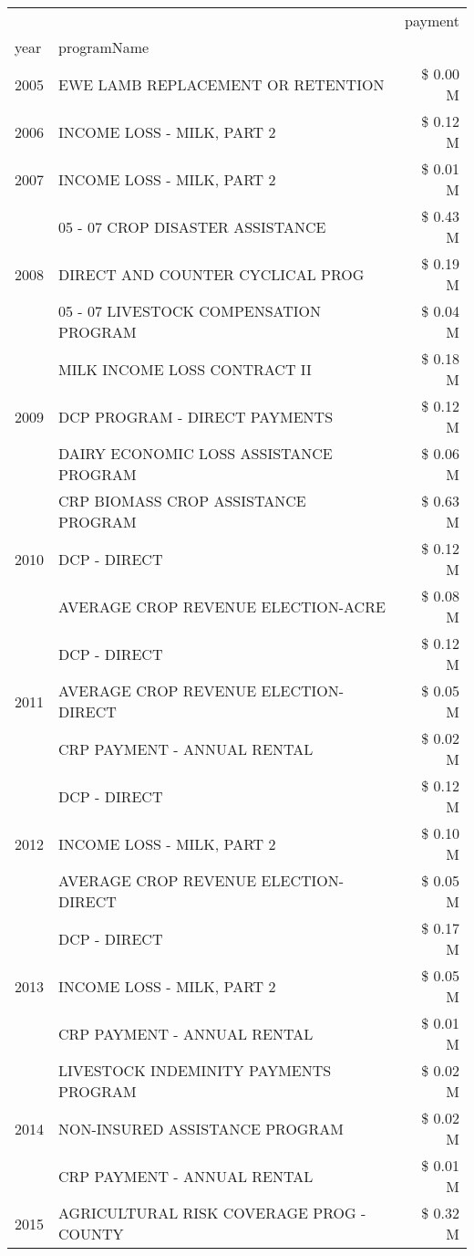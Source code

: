 \begin{tabular}{llr}
\toprule
 &  & payment \\
year & programName &  \\
\midrule
2005 & EWE LAMB REPLACEMENT OR RETENTION & \$ 0.00 M \\
\cline{1-3}
2006 & INCOME LOSS - MILK, PART 2 & \$ 0.12 M \\
\cline{1-3}
2007 & INCOME LOSS - MILK, PART 2 & \$ 0.01 M \\
\cline{1-3}
\multirow[t]{3}{*}{2008} & 05 - 07 CROP DISASTER ASSISTANCE & \$ 0.43 M \\
 & DIRECT AND COUNTER CYCLICAL PROG & \$ 0.19 M \\
 & 05 - 07 LIVESTOCK COMPENSATION PROGRAM & \$ 0.04 M \\
\cline{1-3}
\multirow[t]{3}{*}{2009} & MILK INCOME LOSS CONTRACT II & \$ 0.18 M \\
 & DCP PROGRAM - DIRECT PAYMENTS & \$ 0.12 M \\
 & DAIRY ECONOMIC LOSS ASSISTANCE PROGRAM & \$ 0.06 M \\
\cline{1-3}
\multirow[t]{3}{*}{2010} & CRP BIOMASS CROP ASSISTANCE PROGRAM & \$ 0.63 M \\
 & DCP - DIRECT & \$ 0.12 M \\
 & AVERAGE CROP REVENUE ELECTION-ACRE & \$ 0.08 M \\
\cline{1-3}
\multirow[t]{3}{*}{2011} & DCP - DIRECT & \$ 0.12 M \\
 & AVERAGE CROP REVENUE ELECTION-DIRECT & \$ 0.05 M \\
 & CRP PAYMENT - ANNUAL RENTAL & \$ 0.02 M \\
\cline{1-3}
\multirow[t]{3}{*}{2012} & DCP - DIRECT & \$ 0.12 M \\
 & INCOME LOSS - MILK, PART 2 & \$ 0.10 M \\
 & AVERAGE CROP REVENUE ELECTION-DIRECT & \$ 0.05 M \\
\cline{1-3}
\multirow[t]{3}{*}{2013} & DCP - DIRECT & \$ 0.17 M \\
 & INCOME LOSS - MILK, PART 2 & \$ 0.05 M \\
 & CRP PAYMENT - ANNUAL RENTAL & \$ 0.01 M \\
\cline{1-3}
\multirow[t]{3}{*}{2014} & LIVESTOCK INDEMINITY PAYMENTS PROGRAM & \$ 0.02 M \\
 & NON-INSURED ASSISTANCE PROGRAM & \$ 0.02 M \\
 & CRP PAYMENT - ANNUAL RENTAL & \$ 0.01 M \\
\cline{1-3}
\multirow[t]{3}{*}{2015} & AGRICULTURAL RISK COVERAGE PROG - COUNTY & \$ 0.32 M \\

\end{tabular}

